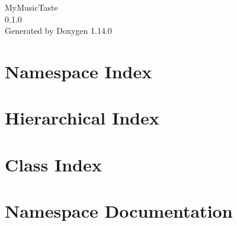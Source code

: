\documentclass[twoside]{book}
\newcommand{\+}{\discretionary{\mbox{\scriptsize$\hookleftarrow$}}{}{}}
\newcommand{\clearemptydoublepage}{%
    \newpage{\pagestyle{empty}\cleardoublepage}%
  }
\begin{document}
  \raggedbottom
    \hypersetup{pageanchor=false,
                bookmarksnumbered=true,
                pdfencoding=unicode
               }
  \begin{titlepage}
  \vspace*{7cm}
  \begin{center}%
  {\Large My\+Music\+Taste}\\
  [1ex]\large 0.\+1.\+0 \\
  \vspace*{1cm}
  {\large Generated by Doxygen 1.14.0}\\
  \end{center}
  \end{titlepage}
  \clearemptydoublepage
  \tableofcontents
  \clearemptydoublepage
  \hypersetup{pageanchor=true}
\chapter{Namespace Index}

\chapter{Hierarchical Index}

\chapter{Class Index}

\chapter{Namespace Documentation}



















\end{document}
